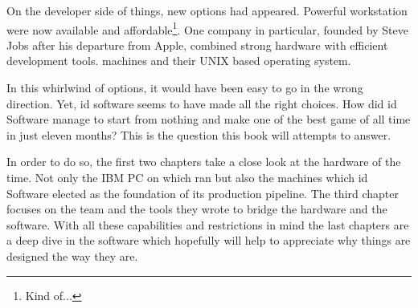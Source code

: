  \par
 On the developer side of things, new options had appeared. Powerful workstation were now available and affordable\footnote{Kind of...}. One company in particular, founded by Steve Jobs after his departure from Apple, combined strong hardware with efficient development tools. \NeXT machines and their UNIX based operating system.\\%
 \par
 In this whirlwind of options, it would have been easy to go in the wrong direction. Yet, id software seems to have made all the right choices. How did id Software manage to start from nothing and make one of the best game of all time in just eleven months? This is the question this book will attempts to answer.\\
 \par
  In order to do so, the first two chapters take a close look at the hardware of the time. Not only the IBM PC on which \doom ran but also the \NeXT machines which id Software elected as the foundation of its production pipeline. The third chapter focuses on the team and the tools they wrote to bridge the hardware and the software. With all these capabilities and restrictions in mind the last chapters are a deep dive in the software which hopefully will help to appreciate why things are designed the way they are.\\

\begin{figure}[H]
\centering
{}
\end{figure}
\par
\vspace{15pt}
\par
\begin{figure}[H]
\centering
{}
\end{figure}

